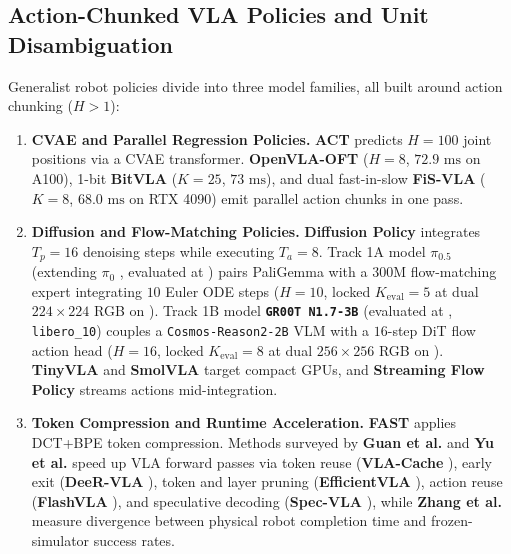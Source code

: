 \documentclass[10pt,letterpaper]{article}
\begin{document}
\subsection{Action-Chunked VLA Policies and Unit Disambiguation}
Generalist robot policies divide into three model families, all built around action chunking ($H > 1$):
\begin{enumerate}
    \item \textbf{CVAE and Parallel Regression Policies.} \textbf{ACT} \cite{Zhao2023learning} predicts $H = 100$ joint positions via a CVAE transformer. \textbf{OpenVLA-OFT} \cite{Kim2025finetuning} ($H = 8$, $72.9\text{ ms}$ on A100), 1-bit \textbf{BitVLA} \cite{Wang2025bitvla} ($K = 25$, $73\text{ ms}$), and dual fast-in-slow \textbf{FiS-VLA} \cite{Chen2025fisvla} ($K = 8$, $68.0\text{ ms}$ on RTX 4090) emit parallel action chunks in one pass.
    \item \textbf{Diffusion and Flow-Matching Policies.} \textbf{Diffusion Policy} \cite{Chi2024diffusion} integrates $T_p = 16$ denoising steps while executing $T_a = 8$. Track 1A model \textbf{$\pi_{0.5}$} \cite{PhysicalIntelligence2025pi05} (extending \textbf{$\pi_0$} \cite{Black2024pi0}, evaluated at ) pairs PaliGemma with a $300\text{M}$ flow-matching expert integrating $10$ Euler ODE steps ($H = 10$, locked $K_{\text{eval}} = 5$ at dual $224\times 224$ RGB on ). Track 1B model \textbf{\texttt{GR00T N1.7-3B}} \cite{Bjorck2025gr00t} (evaluated at , \texttt{libero\_10}) couples a \texttt{Cosmos-Reason2-2B} VLM with a $16$-step DiT flow action head ($H = 16$, locked $K_{\text{eval}} = 8$ at dual $256\times 256$ RGB on ). \textbf{TinyVLA} \cite{Wen2024tinyvla} and \textbf{SmolVLA} \cite{Shukor2025smolvla} target compact GPUs, and \textbf{Streaming Flow Policy} \cite{Jiang2025streaming} streams actions mid-integration.
    \item \textbf{Token Compression and Runtime Acceleration.} \textbf{FAST} \cite{Pertsch2025fast} applies DCT+BPE token compression. Methods surveyed by \textbf{Guan et al.} \cite{Guan2025efficient} and \textbf{Yu et al.} \cite{Yu2025survey} speed up VLA forward passes via token reuse (\textbf{VLA-Cache} \cite{Xu2025vlacache}), early exit (\textbf{DeeR-VLA} \cite{Yue2024deervla}), token and layer pruning (\textbf{EfficientVLA} \cite{Yang2025efficientvla}), action reuse (\textbf{FlashVLA} \cite{Tan2025think}), and speculative decoding (\textbf{Spec-VLA} \cite{Wang2025specvla}), while \textbf{Zhang et al.} \cite{Zhang2025experiences} measure divergence between physical robot completion time and frozen-simulator success rates.
\end{enumerate}
\end{document}
